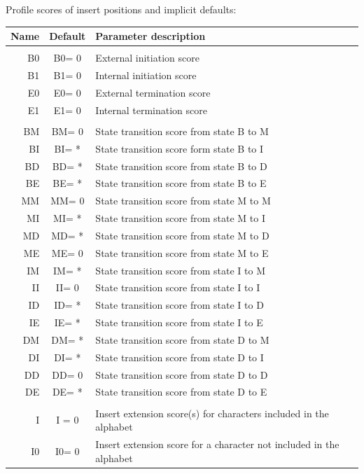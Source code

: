 \documentclass[a4paper,10pt,twoside]{scrartcl}
\begin{document}
  Profile scores of insert positions and implicit defaults:
  \begin{center}
  \begin{tabular}{rcl}
  Name & Default & Parameter description \\
  \hline \\
  B0  &B0= 0  &External initiation score\\
  B1  &B1= 0  &Internal initiation score\\
  E0  &E0= 0  &External termination score\\
  E1  &E1= 0  &Internal termination score\\
  \\
  BM  &BM= 0  &State transition score from state B to M\\
  BI  &BI= *  &State transition score form state B to I\\
  BD  &BD= *  &State transition score from state B to D\\
  BE  &BE= *  &State transition score from state B to E\\
  MM  &MM= 0  &State transition score from state M to M\\
  MI  &MI= *  &State transition score from state M to I\\
  MD  &MD= *  &State transition score from state M to D\\
  ME  &ME= 0  &State transition score from state M to E\\
  IM  &IM= *  &State transition score from state I to M\\
  II  &II= 0  &State transition score from state I to I\\
  ID  &ID= *  &State transition score from state I to D\\
  IE  &IE= *  &State transition score from state I to E\\
  DM  &DM= *  &State transition score from state D to M\\
  DI  &DI= *  &State transition score from state D to I\\
  DD  &DD= 0  &State transition score from state D to D\\
  DE  &DE= *  &State transition score from state D to E\\
  \\
  I   &I = 0  &Insert extension score(s) for characters included in the alphabet\\
  I0  &I0= 0  &Insert extension score for a character not included in the alphabet\\
  \hline
  \end{tabular}
  \end{center}
  
\end{document}
